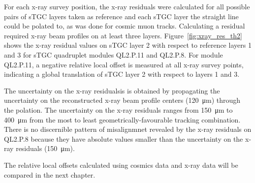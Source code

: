 For each x-ray survey position, the x-ray residuals were calculated for all possible pairs of sTGC layers taken as reference and each sTGC layer the straight line could be polated to, as was done for cosmic muon tracks. Calculating a residual required x-ray beam profiles on at least three layers. Figure~\ref{fig:xray_res_th2} shows the x-ray residual values on sTGC layer 2 with respect to reference layers 1 and 3 for sTGC quadruplet modules QL2.P.11 and QL2.P.8.  For module QL2.P.11, a negative relative local offset is measured at all x-ray survey points, indicating a global translation of sTGC layer 2 with respect to layers 1 and 3.

The uncertainty on the x-ray residualsis is obtained by propagating the uncertainty on the reconstructed x-ray beam profile centers (\SI{120}{\micro\meter}) through the polation. The uncertainty on the x-ray residuals ranges from \SI{150}{\micro\meter} to \SI{400}{\micro\meter} from the most to least geometrically-favourable tracking combination. There is no discernible pattern of misalignmnet revealed by the x-ray residuals on QL2.P.8 because they have absolute values smaller than the uncertainty on the x-ray residuals (\SI{150}{\micro\meter}). 

The relative local offsets calculated using cosmics data and x-ray data will be compared in the next chapter.